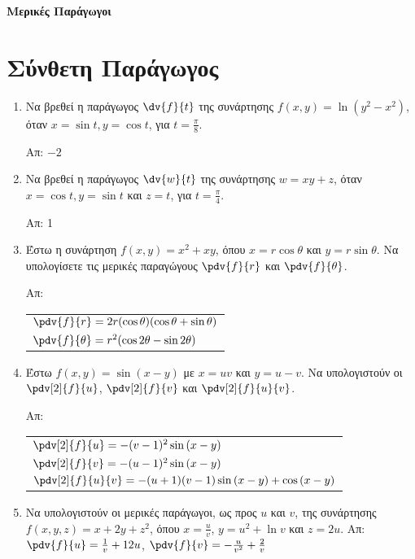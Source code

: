 



\pagestyle{askhseis}







\begin{center}
  {\color{Col1}\bfseries\large Μερικές Παράγωγοι}
\end{center} 


\section*{Σύνθετη Παράγωγος}

\begin{enumerate}
  \item Να βρεθεί η παράγωγος $\dv{f}{t}$ της συνάρτησης 
    $f(x,y)=\ln(y^2-x^2)$, όταν $x=\sin t, y=\cos t$, για $t=\frac{\pi}{8}$.

    \hfill Απ: $-2$

  \item Να βρεθεί η παράγωγος $\dv{w}{t}$ της συνάρτησης 
    $ w = xy+z $, όταν $ x = \cos{t}, y = \sin{t}$ και $ z = t $, για 
    $ t = \frac{ \pi }{ 4 } $.

    \hfill Απ: 1

  \item Έστω η συνάρτηση  $ f(x,y) = x^{2} + xy $, όπου $ x=r \cos{\theta} $ και 
    $ y= r \sin{\theta} $. 
    Να υπολογίσετε τις μερικές παραγώγους $ \pdv{f}{r} $ και $ \pdv{f}{\theta} $.  

    \hfill Απ: \begin{tabular}{l}
      $ \pdv{f}{r} = 2r(\cos{\theta} )(\cos{\theta} + \sin{\theta}) $ \\[10pt]
      $ \pdv{f}{\theta}=r^{2}(\cos{2\theta} - \sin{2 \theta}) $
    \end{tabular}

  \item Έστω $ f(x,y) = \sin{(x-y)} $ με $ x = uv $ και $ y = u-v $. Να 
    υπολογιστούν οι $ \pdv[2]{f}{u} $, $ \pdv[2]{f}{v} $ και $ \pdv[2]{f}{u}{v} $.

    \hfill Απ: \begin{tabular}{l}
      $ \pdv[2]{f}{u} = -(v-1)^{2} \sin{(x-y)} $ \\
      $ \pdv[2]{f}{v} = -(u-1)^{2} \sin{(x-y)} $ \\
      $ \pdv[2]{f}{u}{v} = -(u+1)(v-1) \sin{(x-y)} + \cos{(x-y)} $
    \end{tabular}

  \item Να υπολογιστούν οι μερικές παράγωγοι, ως προς $u$ και $v$, 
    της συνάρτησης $ f(x,y,z) = x + 2y + z^{2}$, όπου $ x = \frac{ u }{ v } $, 
    $y = u^{2} + \ln{v} $ και $ z = 2u $.
    \hfill Απ: $ \pdv{f}{u} = \frac{1}{ v } + 12u $, 
    $\pdv{f}{v} = -\frac{ u }{ v^{2} } + \frac{ 2 }{ v } $
\end{enumerate}


